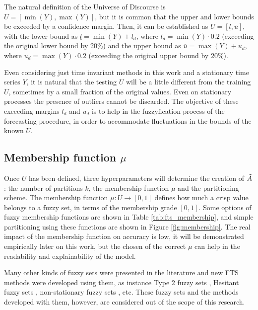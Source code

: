 The natural definition of the Universe of Discourse is $U = [\min(Y),\max(Y)]$, but it is common that the upper and lower bounds be exceeded by a confidence margin. Then, it can be established as $U = [\underline{l}, \overline{u}]$, with the lower bound as $\underline{l} = \min(Y) + l_d$, where $l_d = \min(Y)\cdot 0.2$ (exceeding the original lower bound by 20\%) and the upper bound as $\overline{u} = \max(Y) + u_d$, where $u_d = \max(Y)\cdot 0.2$ (exceeding the original upper bound by 20\%). 

Even considering just time invariant methods in this work and a stationary time series $Y$, it is natural that the testing $U$ will be a little different from the training $U$, sometimes by a small fraction of the original values. Even on stationary processes the presence of outliers cannot be discarded. The objective of these exceeding margins $l_d$ and $u_d$ is to help in the fuzzyfication process of the forecasting procedure, in order to accommodate fluctuations in the bounds of the known $U$.

%
\subsection{Membership function $\mu$}\index{$\mu$}
\label{sec:fts_membership}

Once $U$ has been defined, three hyperparameters will determine the creation of $\tilde{A}$: the number of partitions $k$, the membership function $\mu$ and the partitioning scheme. The membership function $\mu: U \rightarrow [0,1]$ defines how much a crisp value belongs to a fuzzy set, in terms of the membership grade $[0,1]$. Some options of fuzzy membership functions are shown in Table \ref{tab:fts_membership}, and simple partitioning using these functions are shown in Figure \ref{fig:membership}. The real impact of the membership function on accuracy is low, it will be demonstrated empirically later on this work, but the chosen of the correct $\mu$ can help in the readability and explainability of the model.

Many other kinds of fuzzy sets were presented in the literature and new FTS methods were developed using them, as instance Type 2 fuzzy sets \citep{huarng2005type, Bajestani2011}, Hesitant fuzzy sets \citep{Bisht2016}, non-stationary fuzzy sets \citep{Alves2018}, etc. These fuzzy sets and the methods developed with them, however, are considered out of the scope of this research.

